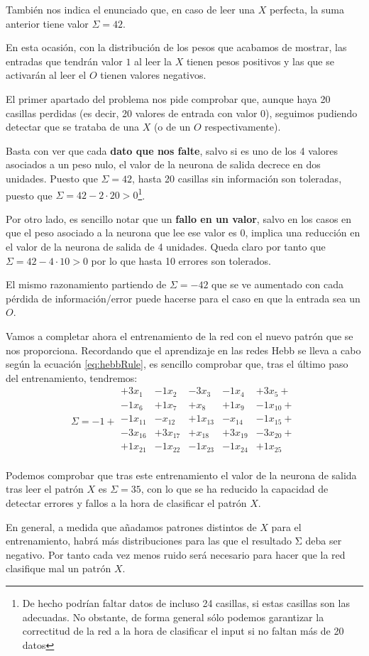 \begin{problem}[3]
También nos indica el enunciado que, en caso de leer una $X$ perfecta, la suma anterior tiene valor $Σ=42$.

En esta ocasión, con la distribución de los pesos que acabamos de mostrar, las entradas que tendrán valor $1$ al leer la $X$ tienen pesos positivos y las que se activarán al leer el $O$ tienen valores negativos.

\spart
El primer apartado del problema nos pide comprobar que, aunque haya 20 casillas perdidas (es decir, 20 valores de entrada con valor 0), seguimos pudiendo detectar que se trataba de una $X$ (o de un $O$ respectivamente).

Basta con ver que cada \textbf{dato que nos falte}, salvo si es uno de los 4 valores asociados a un peso nulo, el valor de la neurona de salida decrece en dos unidades. Puesto que $Σ=42$, hasta 20 casillas sin información son toleradas, puesto que $Σ=42-2\cdot 20 > 0$\footnote{De hecho podrían faltar datos de incluso 24 casillas, si estas casillas son las adecuadas. No obstante, de forma general sólo podemos garantizar la correctitud de la red a la hora de clasificar el input si no faltan más de 20 datos}.

\spart
Por otro lado, es sencillo notar que un \textbf{fallo en un valor}, salvo en los casos en que el peso asociado a la neurona que lee ese valor es 0, implica una reducción en el valor de la neurona de salida de 4 unidades. Queda claro por tanto que $Σ=42-4\cdot 10>0$ por lo que hasta 10 errores son tolerados.

El mismo razonamiento partiendo de $Σ=-42$ que se ve aumentado con cada pérdida de información/error puede hacerse para el caso en que la entrada sea un $O$.

\spart
Vamos a completar ahora el entrenamiento de la red con el nuevo patrón que se nos proporciona. Recordando que el aprendizaje en las redes Hebb se lleva a cabo según la ecuación \ref{eq:hebbRule}, es sencillo comprobar que, tras el último paso del entrenamiento, tendremos:
\[Σ = -1 + \begin{array}{ccccc}
+3x_1& -1x_2 & -3x_3 & -1x_4 & +3x_5 +\\
-1x_6 & + 1x_7 & +x_8 & + 1x_9 &- 1x_{10} +\\
-1x_{11} & -x_{12} & +1x_{13} & -x_{14} & -1x_{15} + \\
-3x_{16} & +3x_{17} & +x_{18} & +3x_{19} & -3x_{20} + \\
+1x_{21} & -1x_{22} & -1x_{23} & -1x_{24} & +1x_{25} \\
\end{array}\]

Podemos comprobar que tras este entrenamiento el valor de la neurona de salida tras leer el patrón $X$ es $Σ=35$, con lo que se ha reducido la capacidad de detectar errores y fallos a la hora de clasificar el patrón $X$.

En general, a medida que añadamos patrones distintos de $X$ para el entrenamiento, habrá más distribuciones para las que el resultado Σ deba ser negativo. Por tanto cada vez menos ruido será necesario para hacer que la red clasifique mal un patrón $X$.
\end{problem}

